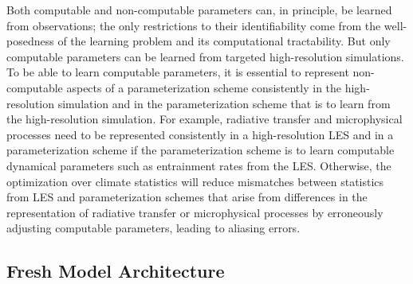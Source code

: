 \documentclass{article}
\begin{document}
Both computable and non-computable parameters can, in principle, be learned from observations; the only restrictions to their identifiability come  from the well-posedness of the learning problem and its computational tractability. But only computable parameters can be learned from targeted high-resolution simulations. To be able to learn computable parameters, it is essential to represent non-computable aspects of a parameterization scheme consistently in the high-resolution simulation and in the parameterization scheme that is to learn from the high-resolution simulation. For example, radiative transfer and microphysical processes need to be represented consistently in a high-resolution LES and in a parameterization scheme if the parameterization scheme is to learn computable dynamical parameters such as entrainment rates from the LES. Otherwise, the optimization over climate statistics will reduce mismatches between statistics from LES and parameterization schemes that arise from differences in the representation of radiative transfer or microphysical processes by erroneously adjusting computable parameters, leading to aliasing errors.

\subsection{Fresh Model Architecture}
\end{document}
